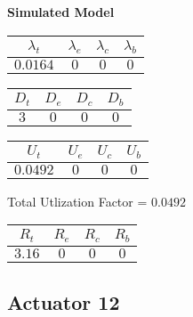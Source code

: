 \documentclass{article}
\begin{document}
\begin{minipage}{0.5\textwidth}
\centering	\textbf{Simulated Model}
\begin{table}[H]
\centering
\begin{tabular}{@{}cccc@{}}
\toprule
$\lambda_t$ & $\lambda_e$ & $\lambda_c$ & $\lambda_b$\\
\midrule
$0.0164$ & $0$ & $0$ & $0$\\
\bottomrule
\end{tabular}
\end{table}
\begin{table}[H]
\centering
\begin{tabular}{@{}cccc@{}}
\toprule
$D_t$ & $D_e$ & $D_c$ & $D_b$\\
\midrule
$3$ & $0$ & $0$ & $0$\\
\bottomrule
\end{tabular}
\end{table}\begin{table}[H]
\centering
\begin{tabular}{@{}cccc@{}}
\toprule
$U_t$ & $U_e$ & $U_c$ & $U_b$\\
\midrule
$0.0492$ & $0$ & $0$ & $0$\\
\bottomrule
\end{tabular}
\end{table}
\centering Total Utlization Factor = $0.0492$
\begin{table}[H]
\centering
\begin{tabular}{@{}cccc@{}}
\toprule
$R_t$ & $R_e$ & $R_c$ & $R_b$\\
\midrule
$3.16$ & $0$ & $0$ & $0$\\
\bottomrule
\end{tabular}
\end{table}
\end{minipage}\subsection{Actuator 12}
\end{document}
